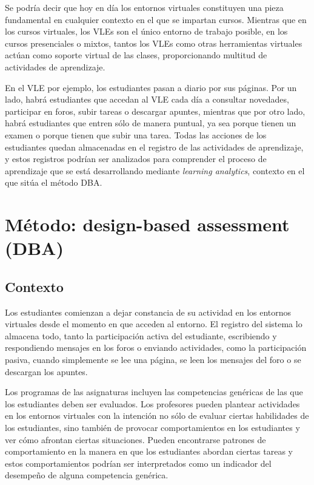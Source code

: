 Se podría decir que hoy en día los entornos virtuales constituyen una pieza fundamental en cualquier contexto en el que se impartan cursos. Mientras que en los cursos virtuales, los VLEs son el único entorno de trabajo posible, en los cursos presenciales o mixtos, tantos los VLEs como otras herramientas virtuales actúan como soporte virtual de las clases, proporcionando multitud de actividades de aprendizaje. 

En el VLE por ejemplo, los estudiantes pasan a diario por sus páginas. Por un lado, habrá estudiantes que accedan al VLE cada día a consultar novedades, participar en foros, subir tareas o descargar apuntes, mientras que por otro lado, habrá estudiantes que entren sólo de manera puntual, ya sea porque tienen un examen o porque tienen que subir una tarea. Todas las acciones de los estudiantes quedan almacenadas en el registro de las actividades de aprendizaje, y estos registros podrían ser analizados para comprender el proceso de aprendizaje que se está desarrollando mediante \emph{learning analytics}, contexto en el que sitúa el método DBA.


\section{Método: design-based assessment (DBA)}

\subsection{Contexto}

Los estudiantes comienzan a dejar constancia de su actividad en los entornos virtuales desde el momento en que acceden al entorno. El registro del sistema lo almacena todo, tanto la participación activa del estudiante, escribiendo y respondiendo mensajes en los foros o enviando actividades, como la participación pasiva, cuando simplemente se lee una página, se leen los mensajes del foro o se descargan los apuntes. 

Los programas de las asignaturas incluyen las competencias genéricas de las que los estudiantes deben ser evaluados. Los profesores pueden plantear actividades en los entornos virtuales con la intención no sólo de evaluar ciertas habilidades de los estudiantes, sino también de provocar comportamientos en los estudiantes y ver cómo afrontan ciertas situaciones. Pueden encontrarse patrones de comportamiento en la manera en que los estudiantes abordan ciertas tareas y estos comportamientos podrían ser interpretados como un indicador del desempeño de alguna competencia genérica.


